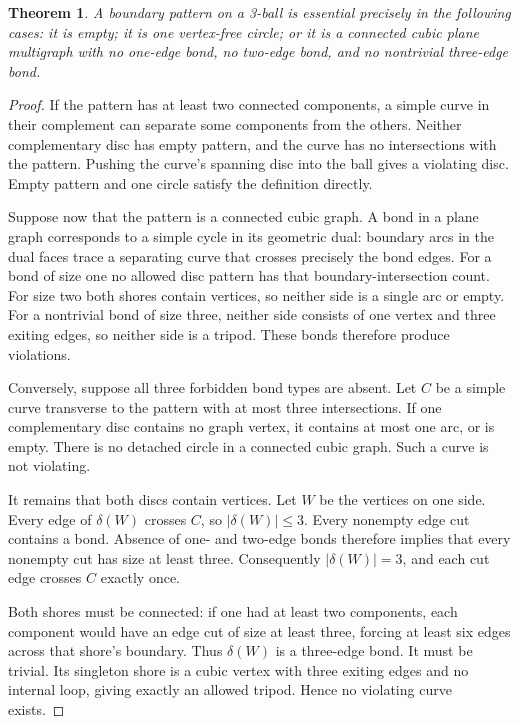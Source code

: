 \documentclass[11pt]{article}
\newtheorem{theorem}{Theorem}[section]
\theoremstyle{remark}\newtheorem{remark}[theorem]{Remark}
\begin{document}
\begin{theorem}\label{thm:pattern}
A boundary pattern on a 3-ball is essential precisely in the following cases:
it is empty; it is one vertex-free circle; or it is a connected cubic plane
multigraph with no one-edge bond, no two-edge bond, and no nontrivial
three-edge bond.
\end{theorem}
\begin{proof}
If the pattern has at least two connected components, a simple curve in their
complement can separate some components from the others. Neither complementary
disc has empty pattern, and the curve has no intersections with the pattern.
Pushing the curve's spanning disc into the ball gives a violating disc. Empty
pattern and one circle satisfy the definition directly.

Suppose now that the pattern is a connected cubic graph. A bond in a plane
graph corresponds to a simple cycle in its geometric dual: boundary arcs in
the dual faces trace a separating curve that crosses precisely the bond edges.
For a bond of size one no allowed disc pattern has that boundary-intersection
count. For size two both shores contain vertices, so neither side is a single
arc or empty. For a nontrivial bond of size three, neither side consists of
one vertex and three exiting edges, so neither side is a tripod. These bonds
therefore produce violations.

Conversely, suppose all three forbidden bond types are absent. Let $C$ be a
simple curve transverse to the pattern with at most three intersections. If
one complementary disc contains no graph vertex, it contains at most one arc,
or is empty. There is no detached circle in a connected cubic graph. Such a
curve is not violating.

It remains that both discs contain vertices. Let $W$ be the vertices on one
side. Every edge of $\delta(W)$ crosses $C$, so $|\delta(W)|\leq3$. Every
nonempty edge cut contains a bond. Absence of one- and two-edge bonds therefore
implies that every nonempty cut has size at least three. Consequently
$|\delta(W)|=3$, and each cut edge crosses $C$ exactly once.

Both shores must be connected: if one had at least two components, each
component would have an edge cut of size at least three, forcing at least six
edges across that shore's boundary. Thus $\delta(W)$ is a three-edge bond.
It must be trivial. Its singleton shore is a cubic vertex with three exiting
edges and no internal loop, giving exactly an allowed tripod. Hence no
violating curve exists.
\end{proof}
\end{document}
